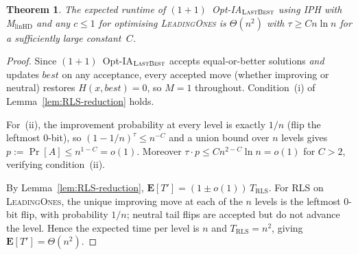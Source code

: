 \documentclass[lettersize,journal]{IEEEtran}
\newcommand{\linHD}{M$_{\text{linHD}}$}
\newcommand{\IPHfcm}{IPH}
\newcommand{\lastBest}{$(1+1)$~Opt-IA$_{\textsc{LastBest}}$}
\newtheorem{theorem}{Theorem}
\begin{document}
\begin{theorem}\label{thm:LBleadingones}
The expected runtime of \lastBest{} using \IPHfcm{} with \linHD{} and any
$c\leq 1$ for optimising \textsc{LeadingOnes} is $\Theta(n^2)$ with
$\tau\geq Cn\ln n$ for a sufficiently large constant~$C$.
\end{theorem}
\begin{proof}
Since \lastBest{} accepts equal-or-better solutions \emph{and} updates
$\mathit{best}$ on any acceptance, every accepted move (whether improving or
neutral) restores $H(x,\mathit{best})=0$, so $M=1$ throughout.
Condition~(i) of Lemma~\ref{lem:RLS-reduction} holds.

For~(ii), the improvement probability at every level is exactly $1/n$
(flip the leftmost $0$-bit), so $(1-1/n)^\tau\leq n^{-C}$
and a union bound over $n$ levels gives $p:=\Pr[A]\leq n^{1-C}=o(1)$.
Moreover $\tau\cdot p\leq Cn^{2-C}\ln n=o(1)$ for $C>2$, verifying
condition~(ii).

By Lemma~\ref{lem:RLS-reduction},
$\mathbf{E}[T']=(1\pm o(1))\,T_{\mathrm{RLS}}$.
For RLS on \textsc{LeadingOnes}, the unique improving move at each of the $n$
levels is the leftmost $0$-bit flip, with probability $1/n$; neutral tail
flips are accepted but do not advance the level.  Hence the expected time per
level is $n$ and $T_{\mathrm{RLS}}=n^2$, giving $\mathbf{E}[T']=\Theta(n^2)$.
\end{proof}
\end{document}
